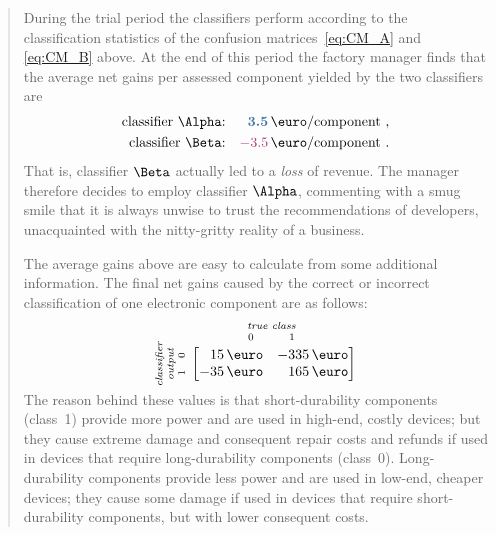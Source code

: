 \documentclass[\ifafour a4paper,12pt,\else a5paper,10pt,\fi%
onecolumn,oneside,article,%
british%
]{memoir}
\theoremstyle{remark}
\theoremstyle{innote}
\renewcommand*{\|}[1][]{\nonscript\:#1\vert\nonscript\:\mathopen{}}
\newcommand*{\good}[1]{\ensuremath{{\color{mypurpleblue}\bm{#1}}}}
\newcommand*{\bad}[1]{\ensuremath{{\color{myredpurple}#1}}}
\begin{document}
\begin{quotation}
During the trial period the classifiers perform according to the classification statistics of the confusion matrices~\eqref{eq:CM_A} and \eqref{eq:CM_B} above. At the end of this period the factory manager finds that the average net gains per assessed component yielded by the two classifiers are
\begin{equation}
  \label{eq:final_gains}
\begin{aligned}
  \text{classifier $\Alpha$:}& & \good{3.5}\,\text{\texteuro/component}&\ , \\
  \text{classifier $\Beta$:}& &\bad{-3.5}\,\text{\texteuro/component}&\ .
\end{aligned}
\end{equation}
That is, classifier $\Beta$ actually led to a \emph{loss} of revenue. The manager therefore decides to employ classifier $\Alpha$, commenting with a smug smile that it is always unwise to trust the recommendations of developers, unacquainted with the nitty-gritty reality of a business.

The average gains above are easy to calculate from some additional information. The final net gains caused by the correct or incorrect classification of one electronic component are as follows:
\begin{equation}
  \label{eq:utility_example}
  \rotatebox[origin=c]{90}{
    \clap{\textit{\parbox{5em}{\centering\scriptsize classifier\\output\\$1\quad 0$}}
    }}\ 
    \overbracket[0pt]{
      \begin{bmatrix*}[r]
        15\,\text{\texteuro} & -335\,\text{\texteuro}  \\
        -35\,\text{\texteuro} & 165\,\text{\texteuro}
      \end{bmatrix*}}^{
      \clap{\textit{\parbox{6em}{\centering\scriptsize true class\\$0\hspace{3em}1$}}
    }}
\end{equation}
The reason behind these values is that short-durability components (class~1) provide more power and are used in high-end, costly devices; but they cause extreme damage and consequent repair costs and refunds if used in devices that require long-durability components (class~0). Long-durability components provide less power and are used in low-end, cheaper devices; they cause some damage if used in devices that require short-durability components, but with lower consequent costs.


\end{quotation}
\end{document}

